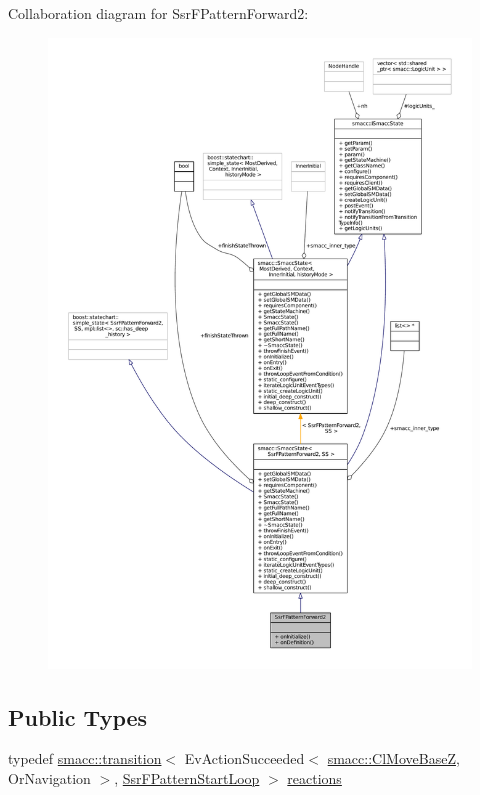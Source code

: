 Collaboration diagram for Ssr\+F\+Pattern\+Forward2\+:
\nopagebreak
\begin{figure}[H]
\begin{center}
\leavevmode
\includegraphics[width=350pt]{structSsrFPatternForward2__coll__graph}
\end{center}
\end{figure}
\subsection*{Public Types}
\begin{DoxyCompactItemize}
\item 
typedef \hyperlink{classsmacc_1_1transition}{smacc\+::transition}$<$ Ev\+Action\+Succeeded$<$ \hyperlink{classsmacc_1_1ClMoveBaseZ}{smacc\+::\+Cl\+Move\+BaseZ}, Or\+Navigation $>$, \hyperlink{structSsrFPatternStartLoop}{Ssr\+F\+Pattern\+Start\+Loop} $>$ \hyperlink{structSsrFPatternForward2_adc3056f3a7551d387d3c1b8dae279e3b}{reactions}
\end{DoxyCompactItemize}
